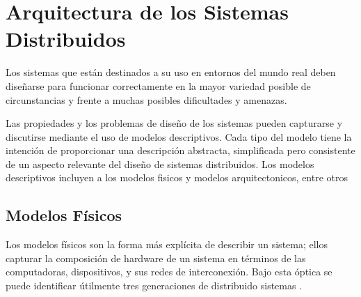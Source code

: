 

\chapter{Arquitectura de los Sistemas Distribuidos}
\label{ch:arq-SD}

Los sistemas que están destinados a su uso en entornos del mundo real deben diseñarse para funcionar correctamente en la mayor variedad posible de circunstancias y frente a muchas posibles dificultades y amenazas.
 
Las propiedades y los problemas de diseño de los sistemas pueden capturarse y discutirse mediante el uso de \gls{modelos  descriptivos}. Cada tipo del modelo tiene la intención de proporcionar una descripción abstracta, simplificada pero consistente de un aspecto relevante del diseño de sistemas distribuidos. Los modelos descriptivos incluyen a los \gls{modelos fisicos} y  \gls{modelos arquitectonicos}, entre otros 
 
\section{Modelos F\'isicos}
\label{sec:fisico-SD}

Los modelos físicos son la forma más explícita de describir un sistema; ellos capturar la composición de hardware de un sistema en términos de las computadoras, dispositivos, y sus redes de interconexión.
Bajo esta óptica se puede identificar útilmente tres generaciones de distribuido sistemas \cite{Coulouris2011}. 

